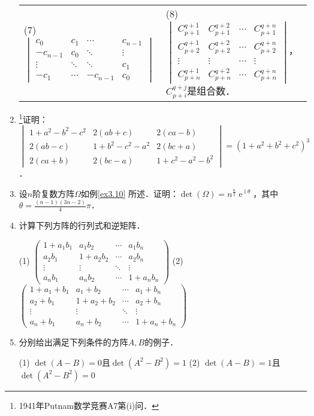 \documentclass[a4paper,fontset=windows]{ctexbook}
\theoremstyle{definition}
\DeclareMathOperator{\E}{e}
\DeclareMathOperator{\I}{i}
\begin{document}
\begin{enumerate}
\begin{tabular}{l@{\qquad\qquad}l}
(7) $\begin{vmatrix}c_0&c_1&\cdots&c_{n-1} \\ -c_{n-1}&c_0&\ddots&\vdots \\ \vdots&\ddots&\ddots&c_1 \\ -c_1&\cdots&-c_{n-1}&c_0 \end{vmatrix}$ &
(8) $\begin{vmatrix}C_{p+1}^{q+1}&C_{p+1}^{q+2}&\cdots&C_{p+1}^{q+n} \\ C_{p+2}^{q+1}&C_{p+2}^{q+2}&\cdots&C_{p+2}^{q+n} \\ \vdots&\vdots&\cdots&\vdots \\ C_{p+n}^{q+1}&C_{p+n}^{q+2}&\cdots&C_{p+n}^{q+n}\end{vmatrix}$，$C_{p+i}^{q+j}$是组合数．
\end{tabular}

\item \footnote{1941年Putnam数学竞赛A7第(i)问．}证明：$\begin{vmatrix}1+a^2-b^2-c^2&2(ab+c)&2(ca-b) \\ 2(ab-c)&1+b^2-c^2-a^2&2(bc+a) \\ 2(ca+b)&2(bc-a)&1+c^2-a^2-b^2\end{vmatrix}=(1+a^2+b^2+c^2)^3$．

\item 设$n$阶复数方阵$\Omega$如例\ref{ex3.10} 所述．证明：$\det(\Omega)=n^{\frac{n}{2}}\E^{\I\theta}$，其中$\theta=\frac{(n-1)(3n-2)}{4}\pi$．

\item 计算下列方阵的行列式和逆矩阵．

(1) $\begin{pmatrix}1+a_1b_1&a_1b_2&\cdots&a_1b_n \\ a_2b_1&1+a_2b_2&\cdots&a_2b_n \\ \vdots&\vdots&\ddots&\vdots \\ a_nb_1&a_nb_2&\cdots&1+a_nb_n\end{pmatrix}$
(2) $\begin{pmatrix}1+a_1+b_1&a_1+b_2&\cdots&a_1+b_n \\ a_2+b_1&1+a_2+b_2&\cdots&a_2+b_n \\ \vdots&\vdots&\ddots&\vdots \\ a_n+b_1&a_n+b_2&\cdots&1+a_n+b_n\end{pmatrix}$

\item 分别给出满足下列条件的方阵$A,B$的例子．

(1) $\det(A-B)=0$且$\det(A^2-B^2)=1$ \hspace{24pt}
(2) $\det(A-B)=1$且$\det(A^2-B^2)=0$


\end{enumerate}
\end{document}
